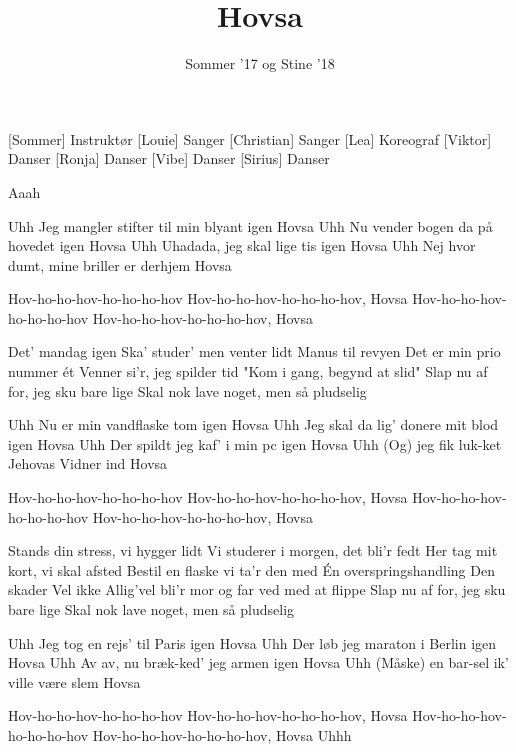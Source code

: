 \documentclass[a4paper,11pt]{article}
\title{Hovsa}
\author{Sommer '17 og Stine '18}
\begin{document}
\maketitle

\begin{roles}
[Sommer] Instruktør
[Louie] Sanger 
[Christian] Sanger 
[Lea] Koreograf
[Viktor] Danser
[Ronja] Danser
[Vibe] Danser
[Sirius] Danser
\end{roles}

\begin{song}

%  
Aaah

%  
Uhh
Jeg mangler stifter til min blyant igen
Hovsa
Uhh
Nu vender bogen da på hovedet igen
Hovsa
Uhh
Uhadada, jeg skal lige tis igen
Hovsa
Uhh
Nej hvor dumt, mine briller er derhjem
Hovsa

% 
Hov-ho-ho-hov-ho-ho-ho-hov
Hov-ho-ho-hov-ho-ho-ho-hov, Hovsa
Hov-ho-ho-hov-ho-ho-ho-hov
Hov-ho-ho-hov-ho-ho-ho-hov, Hovsa

%  
Det' mandag igen 
Ska' studer' men venter lidt
Manus til revyen
Det er min prio nummer ét
Venner si'r, jeg spilder tid
"Kom i gang, begynd at slid"
Slap nu af for, jeg sku bare lige
Skal nok lave noget, men så pludselig

%  
Uhh
Nu er min vandflaske tom igen
Hovsa
Uhh
Jeg skal da lig' donere mit blod igen
Hovsa
Uhh
Der spildt jeg kaf' i min pc igen
Hovsa
Uhh
(Og) jeg fik luk-ket Jehovas Vidner ind
Hovsa

%
Hov-ho-ho-hov-ho-ho-ho-hov
Hov-ho-ho-hov-ho-ho-ho-hov, Hovsa
Hov-ho-ho-hov-ho-ho-ho-hov
Hov-ho-ho-hov-ho-ho-ho-hov, Hovsa

%
Stands din stress, vi hygger lidt
Vi studerer i morgen, det bli'r fedt
Her tag mit kort, vi skal afsted
Bestil en flaske vi ta'r den med
Én overspringshandling
Den skader
Vel ikke
Allig'vel
bli'r mor og far ved med at flippe
Slap nu af for, jeg sku bare lige
Skal nok lave noget, men så pludselig

%
Uhh
Jeg tog en rejs' til Paris igen
Hovsa
Uhh
Der løb jeg maraton i Berlin igen
Hovsa
Uhh
Av av, nu bræk-ked' jeg armen igen
Hovsa
Uhh
(Måske) en bar-sel ik' ville være slem
Hovsa

%
Hov-ho-ho-hov-ho-ho-ho-hov
Hov-ho-ho-hov-ho-ho-ho-hov, Hovsa
Hov-ho-ho-hov-ho-ho-ho-hov
Hov-ho-ho-hov-ho-ho-ho-hov, Hovsa
Uhhh


\end{song}
\end{document}
